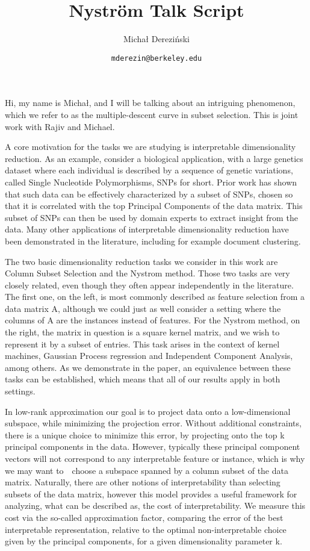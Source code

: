 \documentclass[11pt]{article}
\title{Nystr\"om Talk Script}
\author{Micha{\l} Derezi\'{n}ski}
\date{\texttt{mderezin@berkeley.edu}}
\def\b{{~\textbullet~}}
\begin{document}
  \maketitle%
\setlength{\parskip}{0.5\baselineskip}
\setlength{\parindent}{0pt}


Hi, my name is Micha{\l}, and I will be talking about an intriguing
phenomenon, which we refer to as the multiple-descent curve in subset
selection. This is joint work with Rajiv and Michael. 

A core motivation for the tasks we are studying is interpretable
dimensionality reduction. As an example, consider a biological
application, with a large genetics dataset where each individual is
described by a sequence of genetic variations, called Single
Nucleotide Polymorphisms, SNPs for short. Prior work has shown that
such data can be effectively characterized by a subset of SNPs, chosen
so that it is correlated with the top Principal Components of the data
matrix. This subset of SNPs can then be used by domain experts to
extract insight from the data. Many other applications of
interpretable dimensionality reduction have been demonstrated in the
literature, including for example document clustering. 

The two basic dimensionality reduction tasks we consider in this work
are Column Subset Selection and the
Nystrom method. Those two tasks are very closely related, even though they often
appear independently in the literature. The first one, on the left, is
most commonly described as feature selection from a data matrix A,
although we could just as well consider a setting where the columns of
A are the instances instead of features. For the Nystrom method, on
the right, the matrix in question is a square kernel matrix, and we
wish to represent it by a subset of entries. This task arises in the
context of kernel machines, Gaussian Process regression and
Independent Component Analysis, among others. As we demonstrate in the
paper, an equivalence between these tasks can be established, which
means that all of our results apply in both settings. 

In low-rank approximation our goal is to project data onto a
low-dimensional subspace, while minimizing the projection
error. Without additional constraints, there is a unique choice to
minimize this error, by projecting onto the top k principal components
in the data. However, typically these principal component vectors will
not correspond to any interpretable feature or instance, which is why
we may want to\b choose a subspace spanned by a column subset of the
data matrix. Naturally, there are other notions of interpretability
than selecting subsets of the data matrix, however this model provides
a useful framework for analyzing, what can be described as, the cost
of interpretability. We measure this cost via the so-called
approximation factor, comparing the error of the best interpretable
representation, relative to the optimal non-interpretable choice given
by the principal components, for a given dimensionality parameter k.  
\end{document}
